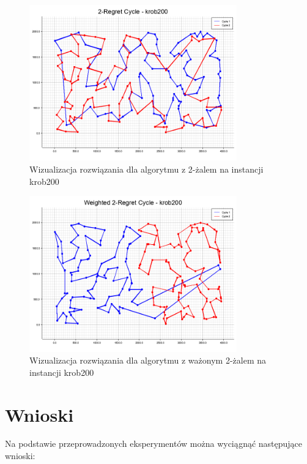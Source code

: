 \documentclass[12pt,a4paper]{article}
\begin{document}
\begin{figure}[H]
\centering
\includegraphics[width=0.8\textwidth]{figures/krob200_2-Regret_Cycle.png}
\caption{Wizualizacja rozwiązania dla algorytmu z 2-żalem na instancji krob200}
\end{figure}

\begin{figure}[H]
\centering
\includegraphics[width=0.8\textwidth]{figures/krob200_Weighted_2-Regret_Cycle.png}
\caption{Wizualizacja rozwiązania dla algorytmu z ważonym 2-żalem na instancji krob200}
\end{figure}

\section{Wnioski}
Na podstawie przeprowadzonych eksperymentów można wyciągnąć następujące wnioski:
\end{document}
